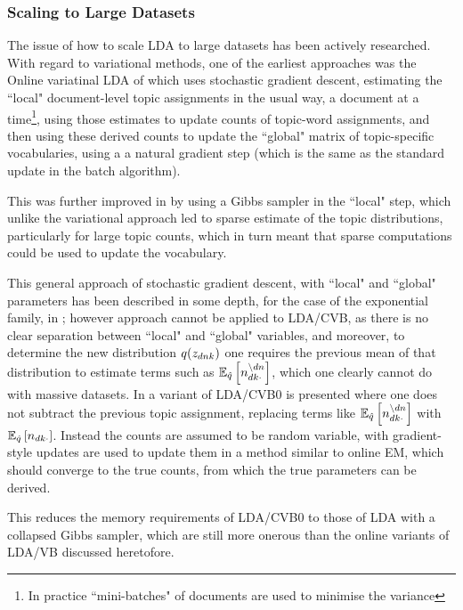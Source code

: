 \subsubsection*{Scaling to Large Datasets}
The issue of how to scale LDA to large datasets has been actively researched. With regard to variational methods, one of the earliest approaches was the Online variatinal LDA of \cite{Hoffman2010} which uses stochastic gradient descent\cite{Bottou2004}\cite{Bottou2008}, estimating the ``local" document-level topic assignments in the usual way, a document at a time\footnote{In practice ``mini-batches" of documents are used to minimise the variance}, using those estimates to update counts of topic-word assignments, and then using these derived counts to update the ``global" matrix of topic-specific vocabularies, using a a natural gradient step (which is the same as the standard update in the batch algorithm).

This was further improved in \cite{Mimno2012a} by using a Gibbs sampler in the ``local" step, which unlike the variational approach led to sparse estimate of the topic distributions, particularly for large topic counts, which in turn meant that sparse computations could be used to update the vocabulary.

This general approach of stochastic gradient descent, with ``local" and ``global" parameters has been described in some depth, for the case of the exponential family, in \cite{Hoffman2012}; however approach cannot be applied to LDA/CVB, as there is no clear separation between ``local" and ``global" variables, and moreover, to determine the new distribution $q(\zdnk)$ one requires the previous mean of that distribution to estimate terms such as $\ex{n_{dk\cdot}^{\setminus dn}}{\hat{q}}$, which one clearly cannot do with massive datasets. In \cite{Boyles2013} a variant of LDA/CVB0 is presented where one does not subtract the previous topic assignment, replacing terms like $\ex{n_{dk\cdot}^{\setminus dn}}{\hat{q}}$ with $\ex{n_{dk\cdot}}{\hat{q}}$. Instead the counts are assumed to be random variable, with gradient-style updates are used to update them in a method similar to online EM\cite{Cappe2009}, which should converge to the true counts, from which the true parameters can be derived. 

This reduces the memory requirements of LDA/CVB0 to those of LDA with a collapsed Gibbs sampler, which are still more onerous than the online variants of LDA/VB discussed heretofore. 


